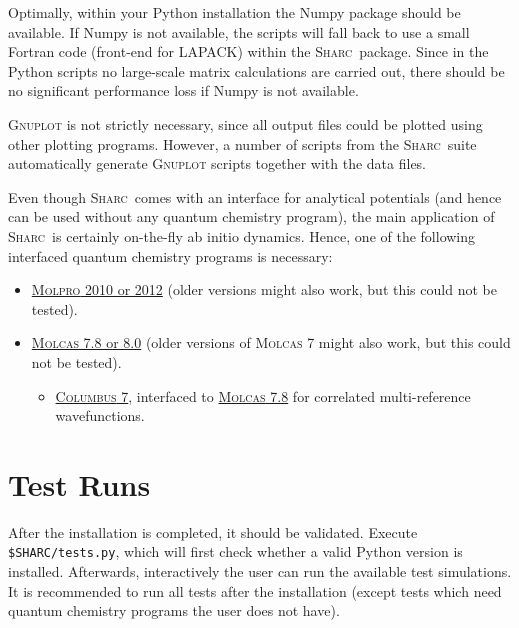\documentclass[a4paper,11pt,DIV=15,openany,twoside=false]{scrbook}
\newcommand{\sharc}{\textsc{Sharc}}
\newcommand{\ttt}[1]{\texttt{#1}}
\begin{document}
Optimally, within your Python installation the Numpy package should be available. If Numpy is not available, the scripts will fall back to use a small Fortran code (front-end for LAPACK) within the \sharc\ package. Since in the Python scripts no large-scale matrix calculations are carried out, there should be no significant performance loss if Numpy is not available.

\textsc{Gnuplot} is not strictly necessary, since all output files could be plotted using other plotting programs. However, a number of scripts from the \sharc\ suite automatically generate \textsc{Gnuplot} scripts together with the data files.

Even though \sharc\ comes with an interface for analytical potentials (and hence can be used without any quantum chemistry program), the main application of \sharc\ is certainly on-the-fly ab initio dynamics. Hence, one of the following interfaced quantum chemistry programs is necessary:
\begin{itemize}
  \item \href{http://www.molpro.net/}{\textsc{Molpro} 2010 or 2012} (older versions might also work, but this could not be tested).
  \item \href{http://http://molcas.org/}{\textsc{Molcas} 7.8 or 8.0} (older versions of \textsc{Molcas} 7 might also work, but this could not be tested).
  \begin{itemize}
    \item \href{http://www.univie.ac.at/columbus/docs_COL70/documentation_main.html}{\textsc{Columbus} 7}, interfaced to \href{http://http://molcas.org/}{\textsc{Molcas} 7.8} for correlated multi-reference wavefunctions. 
  \end{itemize}
\end{itemize}


\section{Test Runs}

After the installation is completed, it should be validated. Execute \ttt{\$SHARC/tests.py}, which will first check whether a valid Python version is installed. Afterwards, interactively the user can run the available test simulations. It is recommended to run all tests after the installation (except tests which need quantum chemistry programs the user does not have). 
\end{document}
